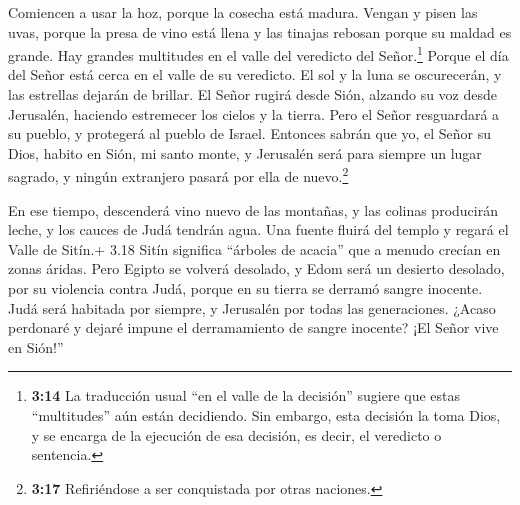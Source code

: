  Comiencen a usar la hoz, porque la cosecha está madura.
Vengan y pisen las uvas, porque la presa de vino está llena y las
tinajas rebosan porque su maldad es grande.  Hay grandes
multitudes en el valle del veredicto del Señor.\footnote{\textbf{3:14}
  La traducción usual ``en el valle de la decisión'' sugiere que estas
  ``multitudes'' aún están decidiendo. Sin embargo, esta decisión la
  toma Dios, y se encarga de la ejecución de esa decisión, es decir, el
  veredicto o sentencia.} Porque el día del Señor está cerca en el valle
de su veredicto.  El sol y la luna se oscurecerán, y las
estrellas dejarán de brillar.  El Señor rugirá desde Sión,
alzando su voz desde Jerusalén, haciendo estremecer los cielos y la
tierra. Pero el Señor resguardará a su pueblo, y protegerá al pueblo de
Israel.  Entonces sabrán que yo, el Señor su Dios, habito
en Sión, mi santo monte, y Jerusalén será para siempre un lugar sagrado,
y ningún extranjero pasará por ella de nuevo.\footnote{\textbf{3:17}
  Refiriéndose a ser conquistada por otras naciones.}

 En ese tiempo, descenderá vino nuevo de las montañas, y
las colinas producirán leche, y los cauces de Judá tendrán agua. Una
fuente fluirá del templo y regará el Valle de Sitín.+ 3.18 Sitín
significa ``árboles de acacia'' que a menudo crecían en zonas áridas.
 Pero Egipto se volverá desolado, y Edom será un desierto
desolado, por su violencia contra Judá, porque en su tierra se derramó
sangre inocente.  Judá será habitada por siempre, y
Jerusalén por todas las generaciones.  ¿Acaso perdonaré y
dejaré impune el derramamiento de sangre inocente? ¡El Señor vive en
Sión!''
